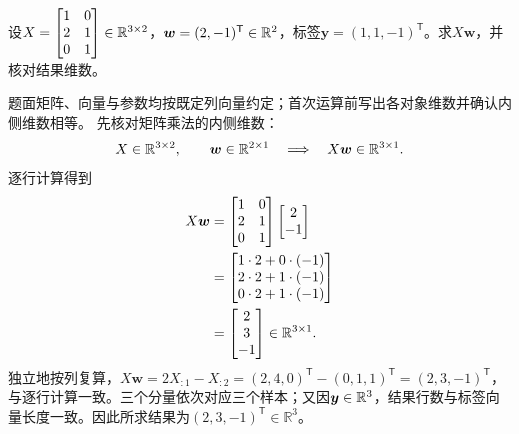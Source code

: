 \begin{example}[三样本数据的类型核对]\label{exm:V1-C01-small}\label{schema:V1-C01:CH-18}\label{schema:V1-C01:CH-32}
设$X=\begin{bmatrix}1&0\\2&1\\0&1\end{bmatrix}\in\mathbb{R}^{3\times2}$，$\boldsymbol{w}=(2,-1)^{\mathsf T}\in\mathbb{R}^2$，标签$\boldsymbol{y}=(1,1,-1)^{\mathsf T}$。求$X\boldsymbol{w}$，并核对结果维数。
\end{example}
\label{schema:V1-C01:CH-33}
\begin{solution}
\SolGiven 题面矩阵、向量与参数均按既定列向量约定；首次运算前写出各对象维数并确认内侧维数相等。
\SolDerive
先核对矩阵乘法的内侧维数：
\[
X\in\mathbb{R}^{3\times2},\qquad
\boldsymbol{w}\in\mathbb{R}^{2\times1}
\quad\Longrightarrow\quad
X\boldsymbol{w}\in\mathbb{R}^{3\times1}.
\]
逐行计算得到
\[
\begin{aligned}
X\boldsymbol{w}
&=
\begin{bmatrix}
1&0\\
2&1\\
0&1
\end{bmatrix}
\begin{bmatrix}
2\\
-1
\end{bmatrix} \\
&=
\begin{bmatrix}
1\cdot2+0\cdot(-1)\\
2\cdot2+1\cdot(-1)\\
0\cdot2+1\cdot(-1)
\end{bmatrix} \\
&=
\begin{bmatrix}
2\\
3\\
-1
\end{bmatrix}
\in\mathbb{R}^{3\times1}.
\end{aligned}
\]
独立地按列复算，$X\boldsymbol w=2X_{:1}-X_{:2}=(2,4,0)^{\mathsf T}-(0,1,1)^{\mathsf T}=(2,3,-1)^{\mathsf T}$，与逐行计算一致。三个分量依次对应三个样本；又因$\boldsymbol{y}\in\mathbb{R}^3$，结果行数与标签向量长度一致。因此所求结果为$(2,3,-1)^{\mathsf T}\in\mathbb R^3$。
\end{solution}

\label{schema:V1-C01:CH-19}
\label{schema:V1-C01:CH-20}
\label{schema:V1-C01:CH-21}
\label{schema:V1-C01:CH-22}
\label{schema:V1-C01:CH-23}
\label{schema:V1-C01:CH-24}
\label{schema:V1-C01:CH-25}
\label{schema:V1-C01:CH-26}
\label{schema:V1-C01:CH-27}
\label{schema:V1-C01:CH-28}
\label{schema:V1-C01:CH-29}

